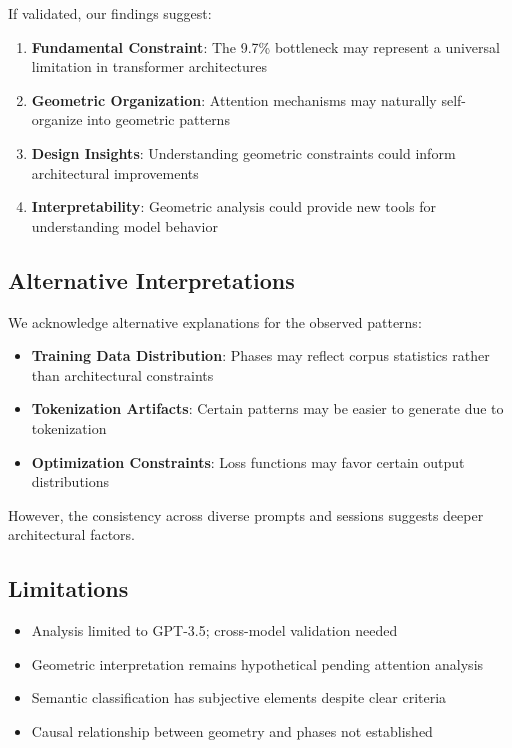 \documentclass[mlmain]{jmlr}
\begin{document}
If validated, our findings suggest:

\begin{enumerate}
\item \textbf{Fundamental Constraint}: The 9.7\% bottleneck may represent a universal limitation in transformer architectures
\item \textbf{Geometric Organization}: Attention mechanisms may naturally self-organize into geometric patterns
\item \textbf{Design Insights}: Understanding geometric constraints could inform architectural improvements
\item \textbf{Interpretability}: Geometric analysis could provide new tools for understanding model behavior
\end{enumerate}

\subsection{Alternative Interpretations}

We acknowledge alternative explanations for the observed patterns:

\begin{itemize}
\item \textbf{Training Data Distribution}: Phases may reflect corpus statistics rather than architectural constraints
\item \textbf{Tokenization Artifacts}: Certain patterns may be easier to generate due to tokenization
\item \textbf{Optimization Constraints}: Loss functions may favor certain output distributions
\end{itemize}

However, the consistency across diverse prompts and sessions suggests deeper architectural factors.

\subsection{Limitations}

\begin{itemize}
\item Analysis limited to GPT-3.5; cross-model validation needed
\item Geometric interpretation remains hypothetical pending attention analysis
\item Semantic classification has subjective elements despite clear criteria
\item Causal relationship between geometry and phases not established
\end{itemize}
\end{document}
